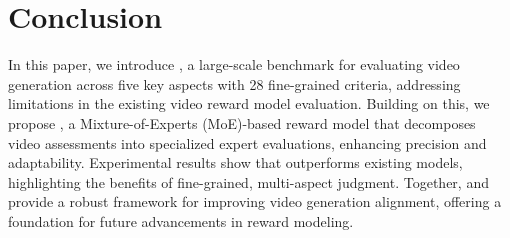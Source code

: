 \section{Conclusion}
In this paper, we introduce \datasetname, a large-scale benchmark for evaluating video generation across five key aspects with 28 fine-grained criteria, addressing limitations in the existing video reward model evaluation. Building on this, we propose \algname, a Mixture-of-Experts (MoE)-based reward model that decomposes video assessments into specialized expert evaluations, enhancing precision and adaptability. Experimental results show that \algname outperforms existing models, highlighting the benefits of fine-grained, multi-aspect judgment. Together, \datasetname and \algname provide a robust framework for improving video generation alignment, offering a foundation for future advancements in reward modeling.








